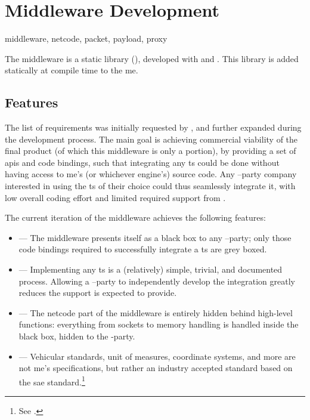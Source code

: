 \chapter{Middleware Development}\label{ch:middleware}

\begin{keywords}
	middleware, netcode, packet, payload, proxy
\end{keywords}

The \gls{middleware} is a  static library (), developed with  and . This library is added statically at compile time to the \gls{me}.

\section{Features}\label{sc:middleware:features}

The list of requirements was initially requested by , and further expanded during the development process. The main goal is achieving commercial viability of the final product (of which this \gls{middleware} is only a portion), by providing a set of \glspl{api} and code bindings, such that integrating any \gls{ts} could be done without having access to \gls{me}'s (or whichever engine's) source code. Any --party company interested in using the \gls{ts} of their choice could thus seamlessly integrate it, with low overall coding effort and limited required support from .

The current iteration of the \gls{middleware} achieves the following \glspl{feature}:

\begin{itemize}
	\item {} --- The \gls{middleware} presents itself as a black box to any --party; only those code bindings required to successfully integrate a \gls{ts} are grey boxed.
	\item {} --- Implementing any \gls{ts} is a (relatively) simple, trivial, and documented process. Allowing a --party to independently develop the integration greatly reduces the support  is expected to provide.
	\item {} --- The \gls{netcode} part of the \gls{middleware} is entirely hidden behind high-level functions: everything from sockets to memory handling is handled inside the black box, hidden to the -party.
	\item {} --- Vehicular standards, unit of measures, coordinate systems, and more are not \gls{me}'s specifications, but rather an industry accepted standard based on the \gls{sae} standard.\footnote{See .}
\end{itemize}

